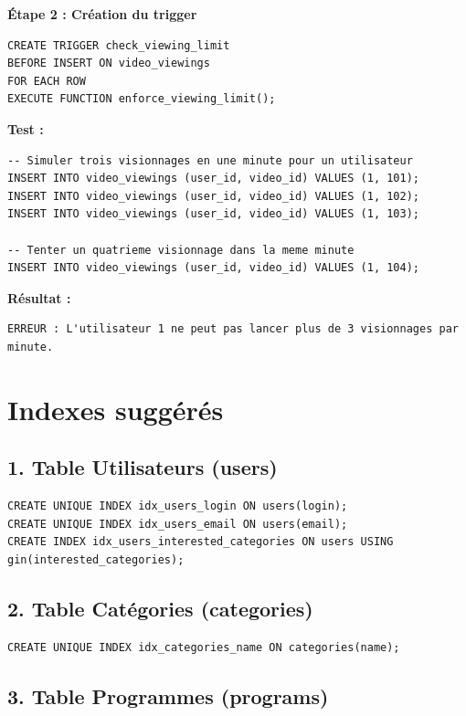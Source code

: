 \documentclass[a4paper, 12pt]{article}
\begin{document}
\textbf{Étape 2 : Création du trigger}

\begin{lstlisting}
CREATE TRIGGER check_viewing_limit
BEFORE INSERT ON video_viewings
FOR EACH ROW
EXECUTE FUNCTION enforce_viewing_limit();
\end{lstlisting}

\textbf{Test :}

\begin{lstlisting}
-- Simuler trois visionnages en une minute pour un utilisateur
INSERT INTO video_viewings (user_id, video_id) VALUES (1, 101);
INSERT INTO video_viewings (user_id, video_id) VALUES (1, 102);
INSERT INTO video_viewings (user_id, video_id) VALUES (1, 103);

-- Tenter un quatrieme visionnage dans la meme minute
INSERT INTO video_viewings (user_id, video_id) VALUES (1, 104);
\end{lstlisting}

\textbf{Résultat :}

\begin{verbatim}
ERREUR : L'utilisateur 1 ne peut pas lancer plus de 3 visionnages par minute.
\end{verbatim}

\section*{Indexes suggérés}

\subsection*{1. Table Utilisateurs (users)}

\begin{lstlisting}
CREATE UNIQUE INDEX idx_users_login ON users(login);
CREATE UNIQUE INDEX idx_users_email ON users(email);
CREATE INDEX idx_users_interested_categories ON users USING gin(interested_categories);
\end{lstlisting}

\subsection*{2. Table Catégories (categories)}

\begin{lstlisting}
CREATE UNIQUE INDEX idx_categories_name ON categories(name);
\end{lstlisting}

\subsection*{3. Table Programmes (programs)}
\end{document}
